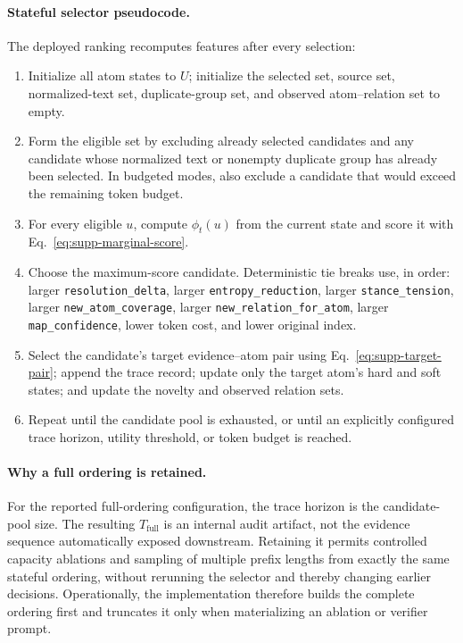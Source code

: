 \paragraph{Stateful selector pseudocode.}
The deployed ranking recomputes features after every selection:

\begin{enumerate}
\item Initialize all atom states to \(U\); initialize the selected set, source
  set, normalized-text set, duplicate-group set, and observed
  atom--relation set to empty.
\item Form the eligible set by excluding already selected candidates and any
  candidate whose normalized text or nonempty duplicate group has already
  been selected.  In budgeted modes, also exclude a candidate that would
  exceed the remaining token budget.
\item For every eligible \(u\), compute \(\phi_t(u)\) from the current state
  and score it with Eq.~\eqref{eq:supp-marginal-score}.
\item Choose the maximum-score candidate.  Deterministic tie breaks use, in
  order: larger \texttt{resolution\_delta}, larger
  \texttt{entropy\_reduction}, larger \texttt{stance\_tension}, larger
  \texttt{new\_atom\_coverage}, larger
  \texttt{new\_relation\_for\_atom}, larger
  \texttt{map\_confidence}, lower token cost, and lower original index.
\item Select the candidate's target evidence--atom pair using
  Eq.~\eqref{eq:supp-target-pair}; append the trace record; update only the
  target atom's hard and soft states; and update the novelty and observed
  relation sets.
\item Repeat until the candidate pool is exhausted, or until an explicitly
  configured trace horizon, utility threshold, or token budget is reached.
\end{enumerate}

\paragraph{Why a full ordering is retained.}
For the reported full-ordering configuration, the trace horizon is the
candidate-pool size.  The resulting \(T_{\mathrm{full}}\) is an internal audit
artifact, not the evidence sequence automatically exposed downstream.
Retaining it permits controlled capacity ablations and sampling of multiple
prefix lengths from exactly the same stateful ordering, without rerunning the
selector and thereby changing earlier decisions.  Operationally, the
implementation therefore builds the complete ordering first and truncates it
only when materializing an ablation or verifier prompt.

